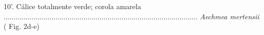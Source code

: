 \begin{customList1}
\begin{customList1}
\begin{customList1}
\begin{customList1}
\begin{customList1}
\begin{customList1}
\begin{customList1}
\item \par{}10'.\allowbreak{} Cálice totalmente verde; corola amarela .\allowbreak{}.\allowbreak{}.\allowbreak{}.\allowbreak{}.\allowbreak{}.\allowbreak{}.\allowbreak{}.\allowbreak{}.\allowbreak{}.\allowbreak{}.\allowbreak{}.\allowbreak{}.\allowbreak{}.\allowbreak{}.\allowbreak{}.\allowbreak{}.\allowbreak{}.\allowbreak{}.\allowbreak{}.\allowbreak{}.\allowbreak{}.\allowbreak{}.\allowbreak{}.\allowbreak{}.\allowbreak{}.\allowbreak{}.\allowbreak{}.\allowbreak{}.\allowbreak{}.\allowbreak{}.\allowbreak{}.\allowbreak{}.\allowbreak{}.\allowbreak{}.\allowbreak{}.\allowbreak{}.\allowbreak{}.\allowbreak{}.\allowbreak{}.\allowbreak{}.\allowbreak{}.\allowbreak{}.\allowbreak{}.\allowbreak{}.\allowbreak{}.\allowbreak{}.\allowbreak{}.\allowbreak{}.\allowbreak{}.\allowbreak{}.\allowbreak{}.\allowbreak{}.\allowbreak{}.\allowbreak{}.\allowbreak{}.\allowbreak{}.\allowbreak{}.\allowbreak{}.\allowbreak{}.\allowbreak{}.\allowbreak{}.\allowbreak{}.\allowbreak{}.\allowbreak{}.\allowbreak{}.\allowbreak{}.\allowbreak{}.\allowbreak{}.\allowbreak{}.\allowbreak{}.\allowbreak{}.\allowbreak{}.\allowbreak{}.\allowbreak{}.\allowbreak{}.\allowbreak{}.\allowbreak{}.\allowbreak{}.\allowbreak{}.\allowbreak{}.\allowbreak{}.\allowbreak{}.\allowbreak{}.\allowbreak{}.\allowbreak{}.\allowbreak{}.\allowbreak{}.\allowbreak{}.\allowbreak{}.\allowbreak{}.\allowbreak{}.\allowbreak{}.\allowbreak{}.\allowbreak{}.\allowbreak{}.\allowbreak{}.\allowbreak{} \textit{Aechmea mertensii} (\allowbreak{} Fig.\allowbreak{} 2d-\allowbreak{}e)\allowbreak{}
\end{customList1}

\end{customList1}

\end{customList1}

\end{customList1}

\end{customList1}


\end{customList1}
\end{customList1}
